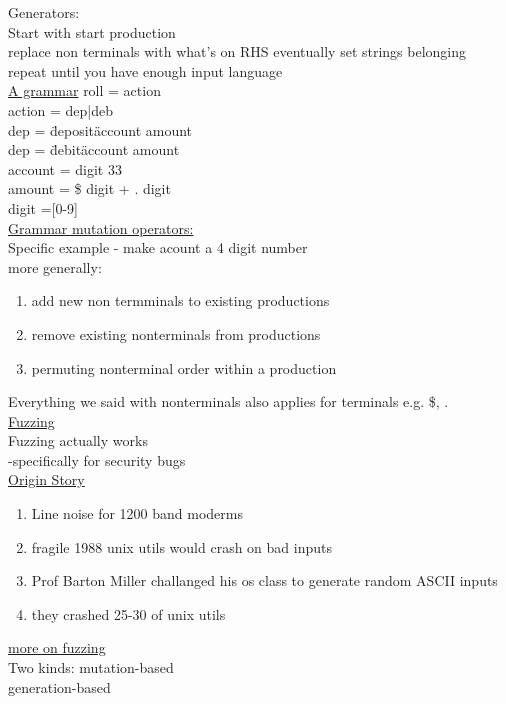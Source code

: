 \documentclass[10pt,usletter]{article}
\newcommand{\tab}[1][1cm]{\hspace*{#1}}
\begin{document}
Generators:\\
Start with start production\\
replace non terminals with what's on RHS eventually set strings belonging\\
repeat until you have enough input language
\\
\underline{A grammar}
roll = action\\
action = dep|deb\\
dep = \"deposit\" account amount\\
dep = \"debit\" account amount\\
account = digit 33\\
amount = \$ digit + . digit\\
digit =[0-9]\\
\underline{Grammar mutation operators:}\\
Specific example - make acount a 4 digit number\\
more generally: 
\begin{enumerate}
\item add new non termminals to existing productions
\item remove existing nonterminals from productions
\item permuting nonterminal order within a production
\end{enumerate}
Everything we said with nonterminals also applies for terminals e.g. \$, .\\

\underline{Fuzzing}\\
Fuzzing actually works\\
\tab -specifically for security bugs\\

\underline{Origin Story}
\begin{enumerate}
\item Line noise for 1200 band moderms
\item fragile 1988 unix utils would crash on bad inputs
\item Prof Barton Miller challanged his os class to generate random ASCII inputs
\item they crashed 25-30 of unix utils
\end{enumerate}

\underline{more on fuzzing}\\
\tab Two kinds: mutation-based\\
\tab\tab generation-based\\
\end{document}

